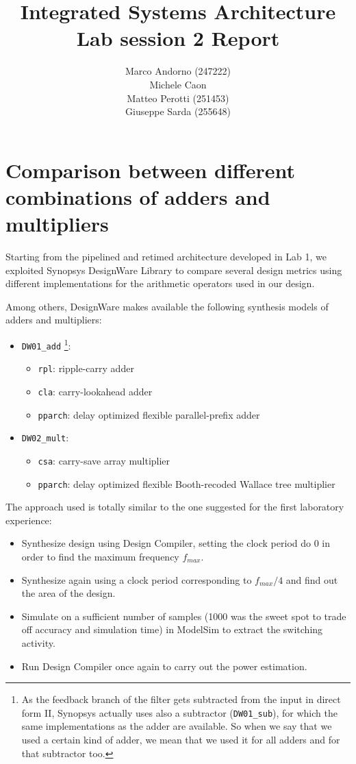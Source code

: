\documentclass[a4paper]{article}
\title{Integrated Systems Architecture\\Lab session 2 Report}
\author{Marco Andorno (247222)\\Michele Caon\\Matteo Perotti (251453)\\Giuseppe Sarda (255648)}
\begin{document}
\maketitle

\section{Comparison between different combinations of adders and multipliers}
Starting from the pipelined and retimed architecture developed in Lab 1, we exploited Synopsys DesignWare Library to compare several design metrics using different implementations for the arithmetic operators used in our design.

Among others, DesignWare makes available the following synthesis models of adders and multipliers:
\begin{itemize}
	\item \texttt{DW01\_add} \footnote{As the feedback branch of the filter gets subtracted from the input in direct form II, Synopsys actually uses also a subtractor (\texttt{DW01\_sub}), for which the same implementations as the adder are available. So when we say that we used a certain kind of adder, we mean that we used it for all adders and for that subtractor too.}:
	\begin{itemize}
		\item \texttt{rpl}: ripple-carry adder
		\item \texttt{cla}: carry-lookahead adder
		\item \texttt{pparch}: delay optimized flexible parallel-prefix adder
	\end{itemize}
	\item \texttt{DW02\_mult}:
	\begin{itemize}
		\item \texttt{csa}: carry-save array multiplier
		\item \texttt{pparch}: delay optimized flexible Booth-recoded Wallace tree multiplier
	\end{itemize}
\end{itemize}

The approach used is totally similar to the one suggested for the first laboratory experience:
\begin{itemize}
	\item Synthesize design using Design Compiler, setting the clock period do 0 in order to find the maximum frequency $f_{max}$.
	\item Synthesize again using a clock period corresponding to $f_{max}/4$ and find out the area of the design.
	\item Simulate on a sufficient number of samples (1000 was the sweet spot to trade off accuracy and simulation time) in ModelSim to extract the switching activity.
	\item Run Design Compiler once again to carry out the power estimation.
\end{itemize}
\end{document}
